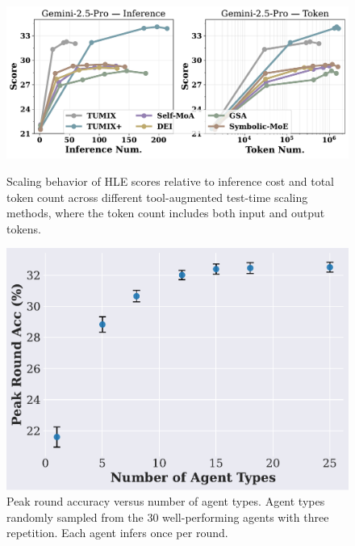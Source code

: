 \begin{figure}[ht]
    \centering
    \begin{minipage}[ht]{0.59\textwidth}
        \centering
        \includegraphics[width=0.98\linewidth]{Figures/scaling_pro_only.pdf}
        \caption{Scaling behavior of HLE scores relative to inference cost and total token count across different tool-augmented test-time scaling methods, where the token count includes both input and output tokens.}
        \label{fig:Scaling_law}
    \end{minipage}%
    \hfill
    \begin{minipage}[ht]{0.39\textwidth}
        \centering
        \includegraphics[width=0.92\linewidth]{Figures/peak_accuracy_vs_agents.pdf}
        \caption{Peak round accuracy versus number of agent types. Agent types randomly sampled from the 30 well-performing agents with three repetition. Each agent infers once per round.}
        \label{fig:peak_accuracy_vs_agents}
    \end{minipage}
\end{figure}

